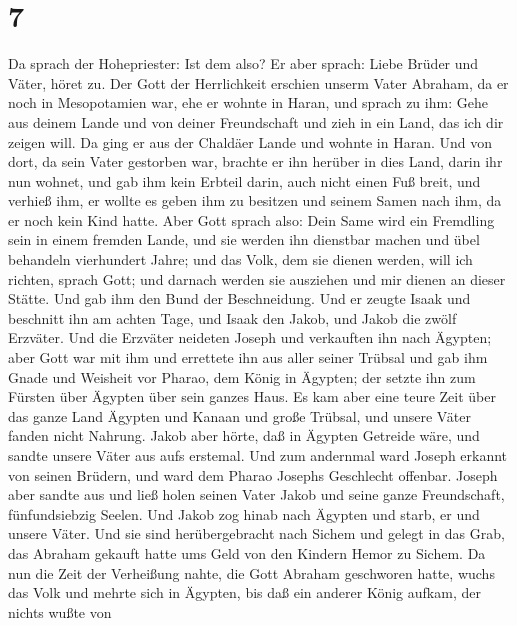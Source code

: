 \hypertarget{section-6}{%
\section{7}\label{section-6}}

 Da sprach der Hohepriester: Ist dem also?  Er
aber sprach: Liebe Brüder und Väter, höret zu. Der Gott der Herrlichkeit
erschien unserm Vater Abraham, da er noch in Mesopotamien war, ehe er
wohnte in Haran,  und sprach zu ihm: Gehe aus deinem Lande
und von deiner Freundschaft und zieh in ein Land, das ich dir zeigen
will.  Da ging er aus der Chaldäer Lande und wohnte in
Haran. Und von dort, da sein Vater gestorben war, brachte er ihn herüber
in dies Land, darin ihr nun wohnet,  und gab ihm kein
Erbteil darin, auch nicht einen Fuß breit, und verhieß ihm, er wollte es
geben ihm zu besitzen und seinem Samen nach ihm, da er noch kein Kind
hatte.  Aber Gott sprach also: Dein Same wird ein Fremdling
sein in einem fremden Lande, und sie werden ihn dienstbar machen und
übel behandeln vierhundert Jahre;  und das Volk, dem sie
dienen werden, will ich richten, sprach Gott; und darnach werden sie
ausziehen und mir dienen an dieser Stätte.  Und gab ihm den
Bund der Beschneidung. Und er zeugte Isaak und beschnitt ihn am achten
Tage, und Isaak den Jakob, und Jakob die zwölf Erzväter. 
Und die Erzväter neideten Joseph und verkauften ihn nach Ägypten; aber
Gott war mit ihm  und errettete ihn aus aller seiner
Trübsal und gab ihm Gnade und Weisheit vor Pharao, dem König in Ägypten;
der setzte ihn zum Fürsten über Ägypten über sein ganzes Haus.
 Es kam aber eine teure Zeit über das ganze Land Ägypten
und Kanaan und große Trübsal, und unsere Väter fanden nicht Nahrung.
 Jakob aber hörte, daß in Ägypten Getreide wäre, und sandte
unsere Väter aus aufs erstemal.  Und zum andernmal ward
Joseph erkannt von seinen Brüdern, und ward dem Pharao Josephs
Geschlecht offenbar.  Joseph aber sandte aus und ließ holen
seinen Vater Jakob und seine ganze Freundschaft, fünfundsiebzig Seelen.
 Und Jakob zog hinab nach Ägypten und starb, er und unsere
Väter.  Und sie sind herübergebracht nach Sichem und gelegt
in das Grab, das Abraham gekauft hatte ums Geld von den Kindern Hemor zu
Sichem.  Da nun die Zeit der Verheißung nahte, die Gott
Abraham geschworen hatte, wuchs das Volk und mehrte sich in Ägypten,
 bis daß ein anderer König aufkam, der nichts wußte von
